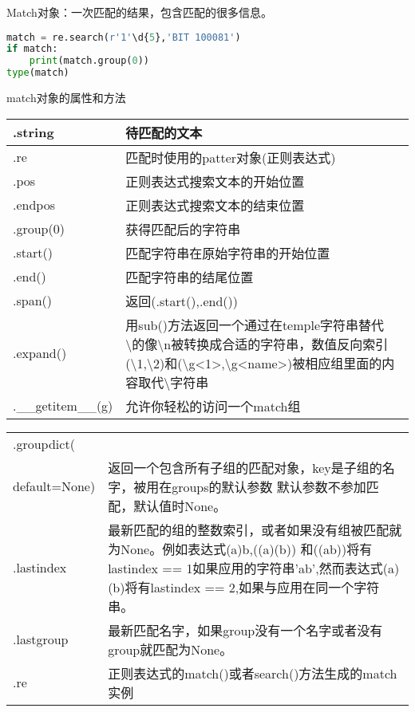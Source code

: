 \documentclass{book}
\begin{document}
Match对象：一次匹配的结果，包含匹配的很多信息。
\begin{lstlisting}[language=Python]
match = re.search(r'1'\d{5},'BIT 100081')
if match:
    print(match.group(0))
type(match)
\end{lstlisting}
match对象的属性和方法

\begin{center}
\begin{tabular}{|p{3cm}|p{8cm}|}
\hline
.string&待匹配的文本\\
\hline
.re&匹配时使用的patter对象(正则表达式)\\
\hline
.pos&正则表达式搜索文本的开始位置\\
\hline
.endpos&正则表达式搜索文本的结束位置\\
\hline
.group(0)&获得匹配后的字符串\\
\hline
.start()&匹配字符串在原始字符串的开始位置\\
\hline
.end()&匹配字符串的结尾位置\\
\hline
.span()&返回(.start(),.end())\\
\hline
.expand()&用sub()方法返回一个通过在temple字符串替代\textbackslash 的像\textbackslash n被转换成合适的字符串，数值反向索引(\textbackslash 1,\textbackslash 2)和(\textbackslash g<1>,\textbackslash g<name>)被相应组里面的内容取代\textbackslash 字符串\\
\hline
.\_\_getitem\_\_(g)&允许你轻松的访问一个match组\\
\hline
\end{tabular}
\end{center}

\begin{center}
\begin{tabular}{|p{2cm}|p{8cm}|}
\hline
.groupdict(\\default=None)&返回一个包含所有子组的匹配对象，key是子组的名字，被用在groups的默认参数
默认参数不参加匹配，默认值时None。\\
\hline
.lastindex&最新匹配的组的整数索引，或者如果没有组被匹配就为None。例如表达式(a)b,((a)(b))
和((ab))将有lastindex == 1如果应用的字符串'ab',然而表达式(a)(b)将有lastindex == 2,如果与应用在同一个字符串。\\
\hline
.lastgroup&最新匹配名字，如果group没有一个名字或者没有group就匹配为None。\\
\hline
.re&正则表达式的match()或者search()方法生成的match实例\\
\hline
\end{tabular}
\end{center}
\end{document}
